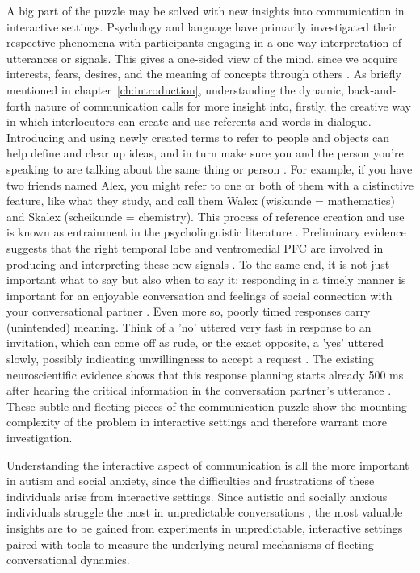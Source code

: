 A big part of the puzzle may be solved with new insights into communication in interactive settings. Psychology and language have primarily investigated their respective phenomena with participants engaging in a one-way interpretation of utterances or signals. This gives a one-sided view of the mind, since we acquire interests, fears, desires, and the meaning of concepts through others \citep{zaki2011,safran2014,defelice2023}. As briefly mentioned in chapter~\ref{ch:introduction}, understanding the dynamic, back-and-forth nature of communication calls for more insight into, firstly, the creative way in which interlocutors can create and use referents and words in dialogue. Introducing and using newly created terms to refer to people and objects can help define and clear up ideas, and in turn make sure you and the person you're speaking to are talking about the same thing or person \citep{brennan1996}. For example, if you have two friends named Alex, you might refer to one or both of them with a distinctive feature, like what they study, and call them Walex (wiskunde = mathematics) and Skalex (scheikunde = chemistry). This process of reference creation and use is known as entrainment in the psycholinguistic literature \citep{brennan2010}. Preliminary evidence suggests that the right temporal lobe and ventromedial PFC are involved in producing and interpreting these new signals \citep{stolk13neural}. To the same end, it is not just important what to say but also when to say it: responding in a timely manner is important for an enjoyable conversation and feelings of social connection with your conversational partner \citep{templeton2022}. Even more so, poorly timed responses carry (unintended) meaning. Think of a 'no' uttered very fast in response to an invitation, which can come off as rude, or the exact opposite, a 'yes' uttered slowly, possibly indicating unwillingness to accept a request \citep{bogels2015never,kendrick2015}. The existing neuroscientific evidence shows that this response planning starts already 500 ms after hearing the critical information in the conversation partner's utterance \citep{bogels2015neural}. These subtle and fleeting pieces of the communication puzzle show the mounting complexity of the problem in interactive settings and therefore warrant more investigation. 

Understanding the interactive aspect of communication is all the more important in autism and social anxiety, since the difficulties and frustrations of these individuals arise from interactive settings. Since autistic and socially anxious individuals struggle the most in unpredictable conversations \citep{roeyers2001,ponnet2008,pilkonis1977,thompson2002}, the most valuable insights are to be gained from experiments in unpredictable, interactive settings paired with tools to measure the underlying neural mechanisms of fleeting conversational dynamics. 

